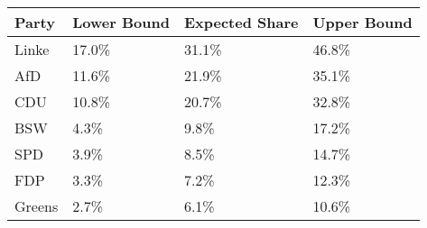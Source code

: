 \begin{tabular}{llll}
  \hline
Party & Lower Bound & Expected Share & Upper Bound \\ 
  \hline
Linke & 17.0\% & 31.1\% & 46.8\% \\ 
  AfD & 11.6\% & 21.9\% & 35.1\% \\ 
  CDU & 10.8\% & 20.7\% & 32.8\% \\ 
  BSW & 4.3\% & 9.8\% & 17.2\% \\ 
  SPD & 3.9\% & 8.5\% & 14.7\% \\ 
  FDP & 3.3\% & 7.2\% & 12.3\% \\ 
  Greens & 2.7\% & 6.1\% & 10.6\% \\ 
   \hline
\end{tabular}
